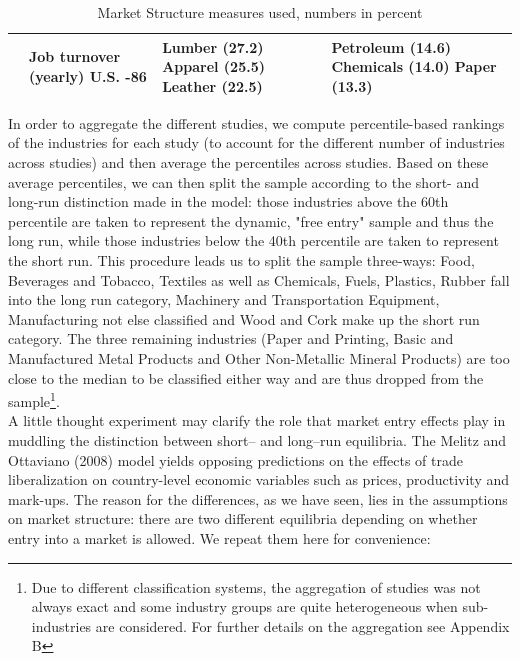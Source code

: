 \documentclass[a4paper,12pt]{article}
\begin{document}
\begin{center}
\begin{table}
\begin{tabular}{|P{2.8cm}|P{4cm}|P{4cm}|P{4cm}|}
\hline
\citet{Baldwin1994} & Job turnover (yearly) \newline U.S. -86 & Lumber (27.2) \newline Apparel (25.5) \newline Leather (22.5) & Petroleum (14.6) \newline Chemicals (14.0) \newline Paper (13.3) \\
\hline   
\end{tabular}\caption{Market Structure measures used, numbers in percent}
\end{table} 
\end{center}

In order to aggregate the different studies, we compute percentile-based rankings of the industries for each study (to account for the different number of industries across studies) and then average the percentiles across studies. Based on these average percentiles, we can then split the sample according to the short- and long-run distinction made in the model: those industries above the 60th percentile are taken to represent the dynamic, "free entry" sample and thus the long run, while those industries below the 40th percentile are taken to represent the short run. This procedure leads us to split the sample three-ways: Food, Beverages and Tobacco, Textiles as well as Chemicals, Fuels, Plastics, Rubber fall into the long run category, Machinery and Transportation Equipment, Manufacturing not else classified and Wood and Cork make up the short run category. The three remaining industries (Paper and Printing, Basic and Manufactured Metal Products and Other Non-Metallic Mineral Products) are too close to the median to be classified either way and are thus dropped from the sample\footnote{Due to different classification systems, the aggregation of studies was not always exact and some industry groups are quite heterogeneous when sub-industries are considered. For further details on the aggregation see Appendix B}. \\
A little thought experiment may clarify the role that market entry effects play in muddling the distinction between short-- and long--run equilibria. The Melitz and Ottaviano (2008) model yields opposing predictions on the effects of trade liberalization on country-level economic variables such as prices, productivity and mark-ups. The reason for the differences, as we have seen, lies in the assumptions on market structure: there are two different equilibria depending on whether entry into a market is allowed. We repeat them here for convenience:
\end{document}
